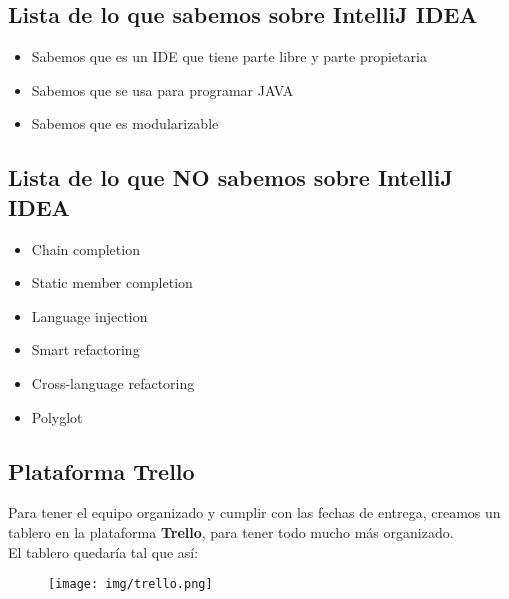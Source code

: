 \documentclass{article}
\begin{document}
        \subsection{Lista de lo que sabemos sobre IntelliJ IDEA}
          \begin{itemize}
            \item Sabemos que es un IDE que tiene parte libre y parte propietaria
            \item Sabemos que se usa para programar JAVA
            \item Sabemos que es modularizable
          \end{itemize}
        \subsection{Lista de lo que NO sabemos sobre IntelliJ IDEA}
          \begin{itemize}
            \item Chain completion
            \item Static member completion
            \item Language injection
            \item Smart refactoring
            \item Cross-language refactoring
            \item Polyglot
          \end{itemize}

        \subsection{Plataforma Trello}
          Para tener el equipo organizado y cumplir con las fechas de entrega, creamos un tablero en la plataforma \textbf{Trello}, para tener todo mucho más organizado.
          \\
          El tablero quedaría tal que así:
          \begin{figure}[h]
            \centering
            \texttt{[image: img/trello.png]}
          \end{figure}
        
\end{document}
